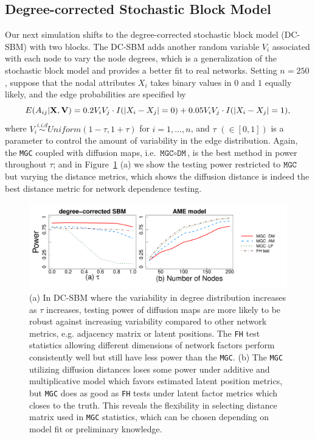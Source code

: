 \documentclass[11pt]{article}
\theoremstyle{definition}
\begin{document}
\subsection{Degree-corrected Stochastic Block Model}
Our next simulation shifts to the degree-corrected stochastic block model (DC-SBM) with two blocks. The DC-SBM adds another random variable $V_{i}$ associated with each node to vary the node degrees, which is a generalization of the stochastic block model and provides a better fit to real networks. Setting $n=250$, suppose that the nodal attributes $X_i$ takes binary values in $0$ and $1$ equally likely, and the edge probabilities are specified by  
\vspace*{-0.4cm}
\begin{equation}
E( A_{ij} | \mathbf{X}, \mathbf{V} )  = 0.2 V_{i} V_{j} \cdot I ( |X_{i} - X_{j}| = 0 ) + 0.05 V_{i} V_{j} \cdot I(|X_{i} - X_{j}| = 1),
\label{eq:tau}
\vspace*{-0.4cm}
\end{equation} 
where $V_{i} \overset{i.i.d}{\sim} Uniform(1 - \tau, 1 + \tau)$ for $i = 1, \ldots, n$, and $\tau$ $(\in [0, 1])$ is a parameter to control the amount of variability in the edge distribution. Again, the \texttt{MGC} coupled with diffusion maps, i.e. $\texttt{MGC} \circ \texttt{DM}$, is the best method in power throughout $\tau$; and in Figure~\ref{fig:combined} (a) we show the testing power restricted to $\texttt{MGC}$ but varying the distance metrics, which shows the diffusion distance is indeed the best distance metric for network dependence testing.

\begin{figure}[ht]
	\centering
	\includegraphics[width=\textwidth]{amedc.pdf}
	\caption{(a) In DC-SBM where the variability in degree distribution increases as $\tau$ increases, testing power of diffusion maps are more likely to be robust against increasing variability compared to other network metrics, e.g. adjacency matrix or latent positions. The \texttt{FH} test statistics allowing different dimensions of network factors perform consistently well but still have less power than the \texttt{MGC}. (b) The \texttt{MGC} utilizing diffusion distances loses some power under additive and multiplicative model which favors estimated latent position metrics, but \texttt{MGC} does as good as \texttt{FH} tests under latent factor metrics which closes to the truth. This reveals the flexibility in selecting distance matrix used in \texttt{MGC} statistics, which can be chosen depending on model fit or preliminary knowledge.}
	\label{fig:combined}
\end{figure}	
\end{document}
